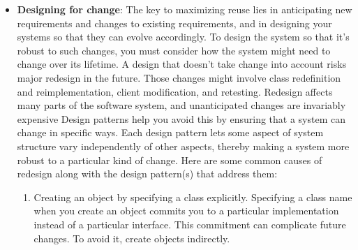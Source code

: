 \documentclass{report}
\begin{document}
\begin{itemize}
            \bigbreak \noindent 
            With such disparity between a program's run-time and compile-time structures, it's clear that code won't reveal everything about how a system will work. The system's run-time structure must be imposed more by the designer than the language. The relationships between objects and their types must be designed with great care, because they determine how good or bad the run-time structure is.
            \bigbreak \noindent 
            Many design patterns (in particular those that have object scope) capture the distinction between compile-time and run-time structures explicitly. Composite (183) and Decorator (196) are especially useful for building complex run-time structures. Observer (326) involves run-time structures that are often hard to understand unless you know the pattern. Chain of Responsibility (251) also results in communication patterns that inheritance doesn't reveal. In general, the run-time structures aren't clear from the code until you understand the patterns.
        \item \textbf{Designing for change}: The key to maximizing reuse lies in anticipating new requirements and changes to existing requirements, and in designing your systems so that they can evolve accordingly.
            \bigbreak \noindent 
            To design the system so that it's robust to such changes, you must consider how the system might need to change over its lifetime. A design that doesn't take change into account risks major redesign in the future. Those changes might involve class redefinition and reimplementation, client modification, and retesting.
            \bigbreak \noindent 
            Redesign affects many parts of the software system, and unanticipated changes are invariably expensive
            \bigbreak \noindent 
            Design patterns help you avoid this by ensuring that a system can change in specific ways. Each design pattern lets some aspect of system structure vary independently of other aspects, thereby making a system more robust to a particular kind of change.
            \bigbreak \noindent 
            Here are some common causes of redesign along with the design pattern(s) that address them:
            \begin{enumerate}
                \item Creating an object by specifying a class explicitly. Specifying a class name when you create an object commits you to a particular implementation instead of a particular interface. This commitment can complicate future changes. To avoid it, create objects indirectly.

\end{enumerate}
\end{itemize}
\end{document}
